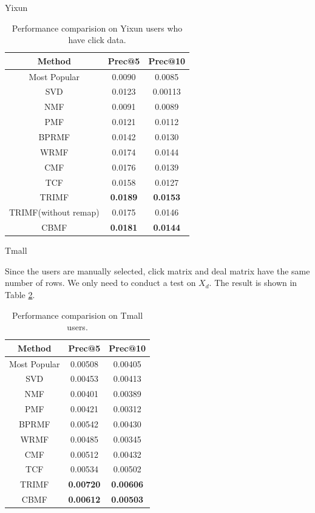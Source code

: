 \begin{subsubsection}{Yixun}
\begin{table}
  \begin{tabular}{|c|c|c|}
    \hline
    Method&Prec@5&Prec@10\\
    \hline
    Most Popular&0.0090&0.0085\\
    \hline
    SVD&0.0123&0.00113\\
    \hline
    NMF&0.0091&0.0089\\
    \hline
    PMF&0.0121&0.0112\\
    \hline
    BPRMF&0.0142&0.0130\\
    \hline
    WRMF&0.0174&0.0144\\
    \hline
    CMF&0.0176&0.0139\\
    \hline
    TCF&0.0158&0.0127\\
    \hline
    TRIMF&\textbf{\color{red}0.0189}&\textbf{\color{red}0.0153}\\
    \hline
    TRIMF(without remap)&0.0175&0.0146\\
    \hline
    CBMF&\textbf{0.0181}&\textbf{0.0144}\\
    \hline
  \end{tabular}
\caption{Performance comparision on Yixun users who have click data.}
  \label{shortclick}
  
\end{table}
\end{subsubsection}


\begin{subsubsection}
  {Tmall}
\par{Since the users are manually selected, click matrix and deal matrix have the same number of rows. We only need to conduct a test on $X_d$. The result is shown in Table \ref{longterm}.}

\begin{table}
  \centering
  \begin{tabular}{|c|c|c|}
    \hline
    Method&Prec@5&Prec@10\\
    \hline
    Most Popular&0.00508&0.00405\\
    \hline
    SVD&0.00453&0.00413\\
    \hline
    NMF&0.00401&0.00389\\
    \hline
    PMF&0.00421&0.00312\\
    \hline
    BPRMF&0.00542&0.00430\\
    \hline
    WRMF&0.00485&0.00345\\
    \hline
    CMF&0.00512&0.00432\\
    \hline
    TCF&0.00534&0.00502\\
    \hline
    TRIMF&\textbf{\color{red}0.00720}&\textbf{\color{red}0.00606}\\
    \hline
    CBMF&\textbf{0.00612}&\textbf{0.00503}\\
    \hline
  \end{tabular}
  \caption{Performance comparision on Tmall users.}
\label{longterm}
\end{table}
\end{subsubsection}



